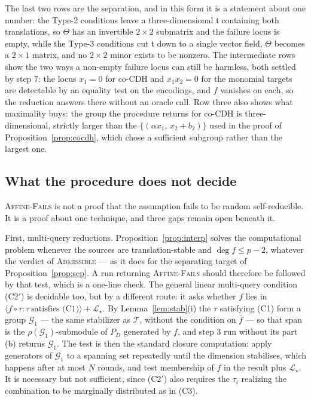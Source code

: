 \documentclass{conjura-solution}
\newcommand{\LL}{\mathcal{L}}
\newcommand{\Span}[1]{\langle #1 \rangle} %
\newcommand{\tge}{\mathfrak{t}}
\begin{document}
\noindent
The last two rows are the separation, and in this form it is a statement about one number: the
Type-2 conditions leave a three-dimensional $\tge$ containing both translations, so
$\Theta$ has an invertible $2\times 2$ submatrix and the failure locus is empty, while the
Type-3 conditions cut $\tge$ down to a single vector field, $\Theta$ becomes a $2\times 1$
matrix, and no $2\times 2$ minor exists to be nonzero. The intermediate rows show the two ways a
non-empty failure locus can still be harmless, both settled by step 7: the locus $x_1=0$ for
co-CDH and $x_1x_2=0$ for the monomial targets are detectable by an equality test on the
encodings, and $f$ vanishes on each, so the reduction answers there without an oracle call.
Row three also shows what maximality buys: the group the procedure returns for co-CDH is
three-dimensional, strictly larger than the $\{(\alpha x_1,\,x_2+b_2)\}$ used in the proof of
Proposition~\ref{prop:cocdh}, which chose a sufficient subgroup rather than the largest one.

\subsection{What the procedure does not decide}
\label{sec:limits}

\textsc{Affine-Fails} is not a proof that the assumption fails to be random self-reducible. It
is a proof about one technique, and three gaps remain open beneath it.

First, multi-query reductions. Proposition~\ref{prop:interp} solves the computational problem
whenever the sources are translation-stable and $\deg f\le p-2$, whatever the verdict of
\textsc{Admissible} --- as it does for the separating target of Proposition~\ref{prop:sep}. A
run returning \textsc{Affine-Fails} should therefore be followed by that test, which is a
one-line check. The general linear multi-query condition \textup{(C2$'$)} is decidable too, but
by a different route: it asks whether $f$ lies in
$\Span{f\circ\tau:\tau\ \text{satisfies (C1)}}+\LL_\star$. By Lemma~\ref{lem:stab}(i) the
$\tau$ satisfying \textup{(C1)} form a group $\mathcal G_1$ --- the same stabilizer as
$\mathcal T$, without the condition on $\bar f$ --- so that span is the $\rho(\mathcal
G_1)$-submodule of $P_D$ generated by $f$, and step 3 run without its part (b) returns
$\mathcal G_1$. The test is then the standard closure computation: apply generators of
$\mathcal G_1$ to a spanning set repeatedly until the dimension stabilises, which happens after
at most $N$ rounds, and test membership of $f$ in the result plus $\LL_\star$. It is necessary
but not sufficient, since \textup{(C2$'$)} also requires the $\tau_i$ realizing the combination
to be marginally distributed as in \textup{(C3)}.
\end{document}
